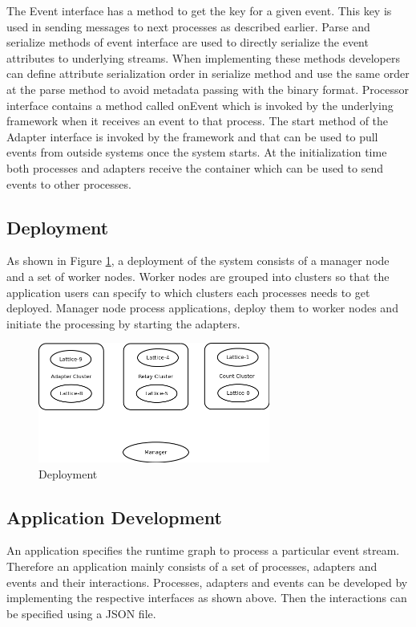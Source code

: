 The Event interface has a method to get the key for a given event. This key is used in sending messages to next processes as described earlier. Parse and serialize methods of event interface are used to directly serialize the event attributes to underlying streams. When implementing these methods developers can define attribute serialization order in serialize method and use the same order at the parse method to avoid metadata passing with the binary format. Processor interface contains a method called onEvent which is invoked by the underlying framework when it receives an event to that process. The start method of the Adapter interface is invoked by the framework and that can be used to pull events from outside systems once the system starts. At the initialization time both processes and adapters receive the container which can be used to send events to other processes.
 
 \subsection{Deployment}

As shown in Figure \ref{deployment}, a deployment of the system consists of a manager node and a set of worker nodes. Worker nodes are grouped into clusters so that the application users can specify to which clusters each processes needs to get deployed. Manager node process applications, deploy them to worker nodes and initiate the processing by starting the adapters.

\begin{figure}[!t]
        \centering
        \includegraphics[width=3.0in]{deployment.png}
        \caption{Deployment}
        \label{deployment}
\end{figure}

\subsection{Application Development}

An application specifies the runtime graph to process a particular event stream. Therefore an application mainly consists of a set of processes, adapters and events and their interactions. Processes, adapters and events can be developed by implementing the respective interfaces as shown above. Then the interactions can be specified using a JSON file. 

